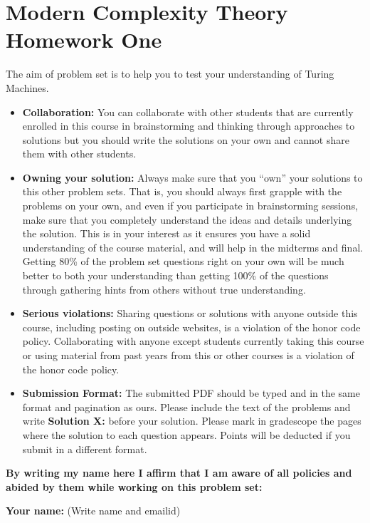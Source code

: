 \documentclass[11pt]{article}
\begin{document}
\section*{Modern Complexity Theory Homework One}\label{homework-one}

The aim of problem set is to help you to test your understanding of Turing Machines.

\begin{itemize}
\item
  {\bf Collaboration:} You can collaborate with other students that are currently enrolled in
  this course  in brainstorming and thinking through approaches to
  solutions but you should write the solutions on your own and cannot
  share them with other students. 
\item
  {\bf Owning your solution:} Always make sure that you ``own'' your solutions to this other problem
  sets. That is, you should always first grapple with the problems on
  your own, and even if you participate in brainstorming sessions, make
  sure that you completely understand the ideas and details underlying
  the solution. This is in your interest as it ensures you have a solid
  understanding of the course material, and will help in the midterms
  and final. Getting 80\% of the problem
  set questions right on your own will be much better to both your
  understanding than getting 100\% of the questions through
  gathering hints from others without true understanding.
\item
  {\bf Serious violations:} Sharing questions or solutions with anyone outside this course,
  including posting on outside websites, is a violation of the honor
  code policy. Collaborating with anyone except students currently
  taking this course or using material from past years from this or
  other courses is a violation of the honor code policy.
\item
  {\bf Submission Format:} The submitted PDF should be typed and in the same format and
  pagination as ours. Please include the text of the problems and write
  \textbf{Solution X:} before your solution. Please mark in gradescope 
  the pages where
  the solution to each question appears. Points will be deducted if you
  submit in a different format.
\end{itemize}

\textbf{By writing my name here I affirm that I am aware of all policies
and abided by them while working on this problem set:}

\textbf{Your name:} (Write name and emailid)
\end{document}
